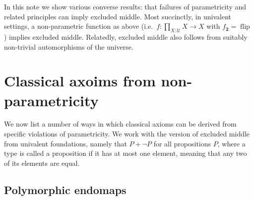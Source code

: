 \documentclass[a4paper,UKenglish]{lipics-v2016}
\newcommand{\UU}{\mathcal{U}}
\newcommand{\bool}{\mathbf{2}}
\newcommand{\flip}{\operatorname{flip}}
\begin{document}
In this note we show various converse results: that failures of parametricity and related principles can imply excluded middle.
%
Most succinctly, in univalent settings, a non-parametric function as above (i.e.\ $f : \prod_{X : \UU} X \to X$ with
$f_\bool = \flip$) implies excluded middle.
%
Relatedly, excluded middle also follows from suitably non-trivial automorphisms of the universe.



\section{Classical axoims from non-parametricity}

We now list a number of ways in which classical axioms can be derived
from specific violations of parametricity. We work with the version of
excluded middle from univalent foundations, namely that $P + \neg P$
for all propositions $P$, where a type is called a proposition if it
has at most one element, meaning that any two of its elements are
equal.

\subsection{Polymorphic endomaps}
\end{document}
